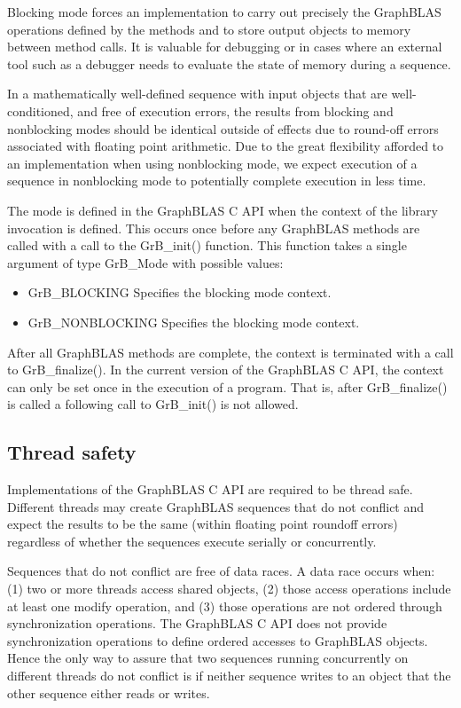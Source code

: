 Blocking mode forces an implementation to carry out precisely the
GraphBLAS operations defined by the methods and to store output objects
to memory between method calls.  It is valuable for debugging or in
cases where an external tool such as a debugger needs to evaluate the
state of memory during a sequence.

In a  mathematically well-defined sequence with input objects that
are well-conditioned, and free of execution errors, the results from
blocking and nonblocking modes should be identical outside of effects
due to round-off errors associated with floating point arithmetic.
Due to the great flexibility afforded to an implementation when using
nonblocking mode, we expect execution of a sequence in nonblocking mode
to potentially complete execution in less time.

The mode is defined in the GraphBLAS C API when the context of the
library invocation is defined.  This occurs once before any GraphBLAS
methods are called with a call to the {\sf GrB\_init()} function.  This function
takes a single argument of type {\sf GrB\_Mode} with possible values:
\begin{itemize}
\item {\sf GrB\_BLOCKING} Specifies the blocking mode context.
\item {\sf GrB\_NONBLOCKING} Specifies the blocking mode context.
\end{itemize}
After all GraphBLAS methods are complete, the context is terminated
with a call to {\sf GrB\_finalize()}.  In the current version of the
GraphBLAS C API, the context can only be set once in the execution of
a program. That is, after {\sf GrB\_finalize()} is called a following
call to {\sf GrB\_init()} is not allowed.


\subsection{Thread safety}
\label{Sec:ThreadSafety}

Implementations of the GraphBLAS C API are required to be thread safe.  Different threads 
may create GraphBLAS sequences that do not conflict and expect the results to be the 
same (within floating point roundoff errors) regardless of whether the sequences execute serially or concurrently.

Sequences that do not conflict are free of data races.  A data race occurs
when: (1) two or more threads access shared objects, (2) those access 
operations include at least one modify operation,
and (3) those operations are not ordered through synchronization operations.   
The GraphBLAS C API does not provide synchronization operations to define 
ordered accesses to GraphBLAS objects. Hence the only way to assure that 
two sequences running concurrently on different threads do not 
conflict is if neither sequence writes to an object that the other 
sequence either reads or writes.

